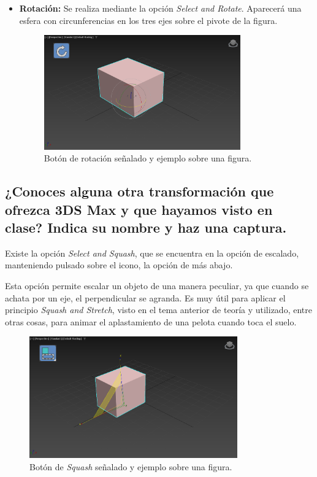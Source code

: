\documentclass{article}
\begin{document}
\begin{itemize}
    \item \textbf{Rotación: }Se realiza mediante la opción \textit{Select and Rotate}. Aparecerá una esfera con circunferencias en los tres ejes sobre el pivote de la figura.
    
    \begin{figure}[H]
        \centering
        \includegraphics[width=0.8\textwidth]{imagenes/rot.png}
        \caption{Botón de rotación señalado y ejemplo sobre una figura.}
     \end{figure}    
\end{itemize}

\newpage

\subsection{¿Conoces alguna otra transformación que ofrezca 3DS Max y que hayamos visto en clase? Indica su nombre y haz una captura.}

Existe la opción \textit{Select and Squash}, que se encuentra en la opción de escalado, manteniendo pulsado sobre el icono, la opción de más abajo.

\bigskip

Esta opción permite escalar un objeto de una manera peculiar, ya que cuando se achata por un eje, el perpendicular se agranda. Es muy útil para aplicar el principio \textit{Squash and Stretch}, visto en el tema anterior de teoría y utilizado, entre otras cosas, para animar el aplastamiento de una pelota cuando toca el suelo.

\begin{figure}[H]
    \centering
    \includegraphics[width=0.8\textwidth]{imagenes/squash.png}
    \caption{Botón de \textit{Squash} señalado y ejemplo sobre una figura.}
 \end{figure} 
\end{document}
